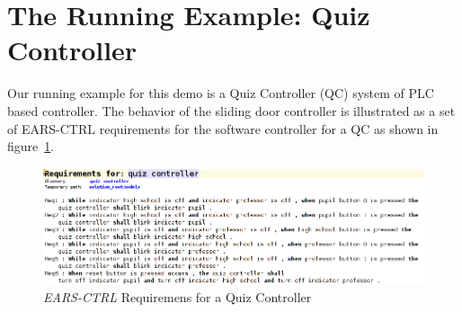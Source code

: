 \vspace{-.5cm}
\section{The Running Example: Quiz Controller}
\label{sec:example}
\vspace{-.3cm}
Our running example for this demo is a Quiz Controller (QC) system of PLC based
controller. The behavior of the sliding door controller is illustrated as a set
of \textsf{EARS-CTRL} requirements for the software controller for a QC as shown in
figure~\ref{fig:QC_reqs}.
\begin{figure}[!h]
\centering
\includegraphics[width=1\textwidth]{./images/QC_Reqs.png}
\caption{\emph{EARS-CTRL} Requiremens for a Quiz Controller}
\label{fig:QC_reqs}
\end{figure}